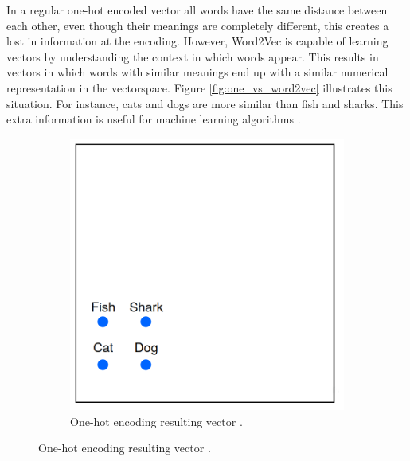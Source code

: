         


        In a regular one-hot encoded vector all words have the same distance between each other, even though their meanings are completely different, this creates a lost in information at the encoding.  However, Word2Vec is capable of learning vectors by understanding the context in which words appear. This results in vectors in which words with similar meanings end up with a similar numerical representation in the vectorspace. Figure \ref{fig:one_vs_word2vec} illustrates this situation. For instance, cats and dogs are more similar than fish and sharks. This extra information is useful for machine learning algorithms \cite{word2vec_explained}.	


        \begin{figure}[H]
            \centering
            \captionsetup{justification=centering}
          
            \begin{subfigure}{0.32\textwidth}
            \includegraphics[width=\textwidth]{Sections/3StateOfTheArt/3_images/one_hot_ex.png} 
            \caption[One-hot encoding resulting vector.]{One-hot encoding resulting vector \cite{word2vec_explained}. }
          

\end{subfigure}
\end{figure}
